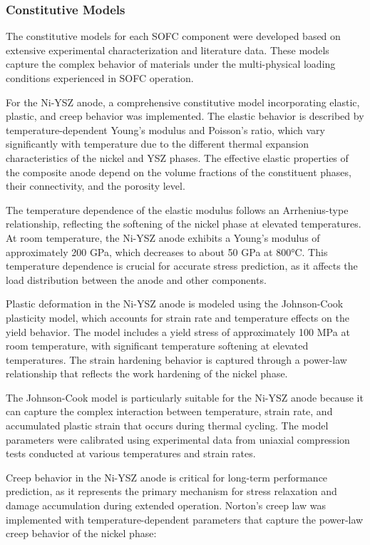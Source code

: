 \documentclass[conference]{IEEEtran}
\begin{document}
\subsubsection{Constitutive Models}

The constitutive models for each SOFC component were developed based on extensive experimental characterization and literature data. These models capture the complex behavior of materials under the multi-physical loading conditions experienced in SOFC operation.

For the Ni-YSZ anode, a comprehensive constitutive model incorporating elastic, plastic, and creep behavior was implemented. The elastic behavior is described by temperature-dependent Young's modulus and Poisson's ratio, which vary significantly with temperature due to the different thermal expansion characteristics of the nickel and YSZ phases. The effective elastic properties of the composite anode depend on the volume fractions of the constituent phases, their connectivity, and the porosity level.

The temperature dependence of the elastic modulus follows an Arrhenius-type relationship, reflecting the softening of the nickel phase at elevated temperatures. At room temperature, the Ni-YSZ anode exhibits a Young's modulus of approximately 200 GPa, which decreases to about 50 GPa at 800°C. This temperature dependence is crucial for accurate stress prediction, as it affects the load distribution between the anode and other components.

Plastic deformation in the Ni-YSZ anode is modeled using the Johnson-Cook plasticity model, which accounts for strain rate and temperature effects on the yield behavior. The model includes a yield stress of approximately 100 MPa at room temperature, with significant temperature softening at elevated temperatures. The strain hardening behavior is captured through a power-law relationship that reflects the work hardening of the nickel phase.

The Johnson-Cook model is particularly suitable for the Ni-YSZ anode because it can capture the complex interaction between temperature, strain rate, and accumulated plastic strain that occurs during thermal cycling. The model parameters were calibrated using experimental data from uniaxial compression tests conducted at various temperatures and strain rates.

Creep behavior in the Ni-YSZ anode is critical for long-term performance prediction, as it represents the primary mechanism for stress relaxation and damage accumulation during extended operation. Norton's creep law was implemented with temperature-dependent parameters that capture the power-law creep behavior of the nickel phase:
\end{document}

